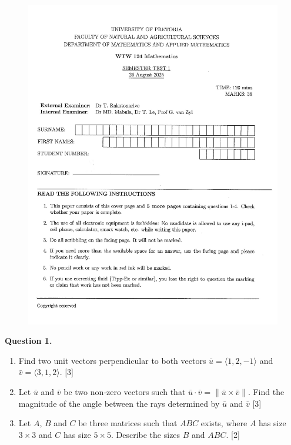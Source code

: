 \documentclass[11pt]{article}
\begin{document}
\begin{figure}[!ht]
    \centering
    \includegraphics[width=1\textwidth]{TitleQP.jpg}
\end{figure}

\newpage

\textbf{Question 1.}
\begin{enumerate}[label=\alph*)]
    \item Find two unit vectors perpendicular to both vectors \(\bar{u} =\langle1,2,-1\rangle\) and \(\bar{v}=\langle3,1,2\rangle\). \hfill [3]
    \vspace{8cm}
    \item Let \(\bar{u}\) and \(\bar{v}\) be two non-zero vectors such that \(\bar{u} \cdot  \bar{v} = \|\bar{u} \times \bar{v}\|\).
    Find the magnitude of the angle between the rays determined by \(\bar{u}\) and \(\bar{v}\) \hfill [3]
    \vspace{8cm}
    \item Let \(A\), \(B\) and \(C\) be three matrices such that \(ABC\) exists, where \(A\) has size \(3\times3\) and \(C\) has size \(5\times5\).
    Describe the sizes \(B\) and \(ABC\). \hfill [2]
\end{enumerate}
\end{document}
